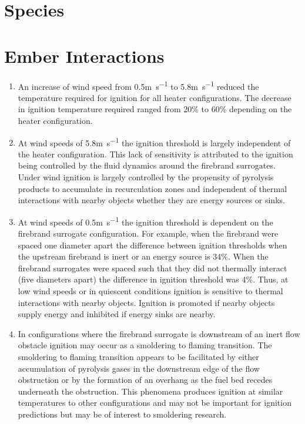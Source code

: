 \section{Species}

\section{Ember Interactions}
        \begin{enumerate}
            \item An increase of wind speed from 0.5\si{\meter\per\second} to 5.8\si{\meter\per\second} reduced the temperature required for ignition for all heater configurations. The decrease in ignition temperature required ranged from 20\% to 60\% depending on the heater configuration. 
            
            \item At wind speeds of 5.8\si{\meter\per\second} the ignition threshold is largely independent of the heater configuration. This lack of sensitivity is attributed to the ignition being controlled by the fluid dynamics around the firebrand surrogates. Under wind ignition is largely controlled by the propensity of pyrolysis products to accumulate in recurculation zones and independent of thermal interactions with nearby objects whether they are energy sources or sinks. 
            \item At wind speeds of 0.5\si{\meter\per\second} the ignition threshold is dependent on the firebrand surrogate configuration. For example, when the firebrand were spaced one diameter apart the difference between ignition thresholds when the upstream firebrand is inert or an energy source is 34\%. When the firebrand surrogates were spaced such that they did not thermally interact (five diameters apart) the difference in ignition threshold was 4\%. Thus, at low wind speeds or in quiescent conditions ignition is sensitive to thermal interactions with nearby objects. Ignition is promoted if nearby objects supply energy and inhibited if energy sinks are nearby. 
            
            \item In configurations where the firebrand surrogate is downstream of an inert flow obstacle ignition may occur as a smoldering to flaming transition. The smoldering to flaming transition appears to be facilitated by either accumulation of pyrolysis gases in the downstream edge of the flow obstruction or by the formation of an overhang as the fuel bed recedes underneath the obstruction. This phenomena produces ignition at similar temperatures to other configurations and may not be important for ignition predictions but may be of interest to smoldering research. 
        \end{enumerate}

